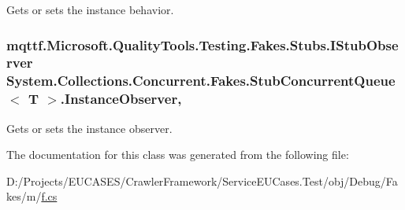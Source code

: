 Gets or sets the instance behavior.

\hypertarget{class_system_1_1_collections_1_1_concurrent_1_1_fakes_1_1_stub_concurrent_queue_3_01_t_01_4_a34d1fc2fcd971d06ce4fd9787870e560}{
\subsubsection[{Instance\-Observer}]{\setlength{\rightskip}{0pt plus 5cm}mqttf.\-Microsoft.\-Quality\-Tools.\-Testing.\-Fakes.\-Stubs.\-I\-Stub\-Observer System.\-Collections.\-Concurrent.\-Fakes.\-Stub\-Concurrent\-Queue$<$ T $>$.Instance\-Observer\hspace{0.3cm}{\ttfamily [get]}, {\ttfamily [set]}}}\label{class_system_1_1_collections_1_1_concurrent_1_1_fakes_1_1_stub_concurrent_queue_3_01_t_01_4_a34d1fc2fcd971d06ce4fd9787870e560}


Gets or sets the instance observer.



The documentation for this class was generated from the following file\-:\begin{DoxyCompactItemize}
\item 
D\-:/\-Projects/\-E\-U\-C\-A\-S\-E\-S/\-Crawler\-Framework/\-Service\-E\-U\-Cases.\-Test/obj/\-Debug/\-Fakes/m/\hyperlink{m_2f_8cs}{f.\-cs}\end{DoxyCompactItemize}

